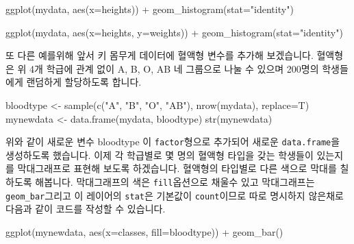 \documentclass[
]{book}
\newenvironment{Shaded}{\begin{snugshade}}{\end{snugshade}}
\newcommand{\AttributeTok}[1]{\textcolor[rgb]{0.77,0.63,0.00}{#1}}
\newcommand{\FunctionTok}[1]{\textcolor[rgb]{0.00,0.00,0.00}{#1}}
\newcommand{\NormalTok}[1]{#1}
\newcommand{\OtherTok}[1]{\textcolor[rgb]{0.56,0.35,0.01}{#1}}
\newcommand{\SpecialCharTok}[1]{\textcolor[rgb]{0.00,0.00,0.00}{#1}}
\newcommand{\StringTok}[1]{\textcolor[rgb]{0.31,0.60,0.02}{#1}}
\begin{document}
\begin{Shaded}
\begin{Highlighting}[]
\FunctionTok{ggplot}\NormalTok{(mydata, }\FunctionTok{aes}\NormalTok{(}\AttributeTok{x=}\NormalTok{heights)) }\SpecialCharTok{+}
  \FunctionTok{geom\_histogram}\NormalTok{(}\AttributeTok{stat=}\StringTok{"identity"}\NormalTok{)}

\FunctionTok{ggplot}\NormalTok{(mydata, }\FunctionTok{aes}\NormalTok{(}\AttributeTok{x=}\NormalTok{heights, }\AttributeTok{y=}\NormalTok{weights)) }\SpecialCharTok{+}
  \FunctionTok{geom\_histogram}\NormalTok{(}\AttributeTok{stat=}\StringTok{"identity"}\NormalTok{)}
\end{Highlighting}
\end{Shaded}

또 다른 예를위해 앞서 키 몸무게 데이터에 혈액형 변수를 추가해 보겠습니다. 혈액형은 위 4개 학급에 관계 없이 A, B, O, AB 네 그룹으로 나눌 수 있으며 200명의 학생들에게 랜덤하게 할당하도록 합니다.

\begin{Shaded}
\begin{Highlighting}[]
\NormalTok{bloodtype }\OtherTok{\textless{}{-}} \FunctionTok{sample}\NormalTok{(}\FunctionTok{c}\NormalTok{(}\StringTok{"A"}\NormalTok{, }\StringTok{"B"}\NormalTok{, }\StringTok{"O"}\NormalTok{, }\StringTok{"AB"}\NormalTok{), }\FunctionTok{nrow}\NormalTok{(mydata), }\AttributeTok{replace=}\NormalTok{T)}
\NormalTok{mynewdata }\OtherTok{\textless{}{-}} \FunctionTok{data.frame}\NormalTok{(mydata, bloodtype)}
\FunctionTok{str}\NormalTok{(mynewdata)}
\end{Highlighting}
\end{Shaded}

위와 같이 새로운 변수 bloodtype 이 \texttt{factor}형으로 추가되어 새로운 \texttt{data.frame}을 생성하도록 했습니다. 이제 각 학급별로 몇 명의 혈액형 타입을 갖는 학생들이 있는지를 막대그래프로 표현해 보도록 하겠습니다. 혈액형의 타입별로 다른 색으로 막대를 칠하도록 해봅니다. 막대그래프의 색은 \texttt{fill}옵션으로 채울수 있고 막대그래프는 \texttt{geom\_bar}그리고 이 레이어의 \texttt{stat}은 기본값이 \texttt{count}이므로 따로 명시하지 않은채로 다음과 같이 코드를 작성할 수 있습니다.

\begin{Shaded}
\begin{Highlighting}[]
\FunctionTok{ggplot}\NormalTok{(mynewdata, }\FunctionTok{aes}\NormalTok{(}\AttributeTok{x=}\NormalTok{classes, }\AttributeTok{fill=}\NormalTok{bloodtype)) }\SpecialCharTok{+}
  \FunctionTok{geom\_bar}\NormalTok{()}
\end{Highlighting}
\end{Shaded}
\end{document}
